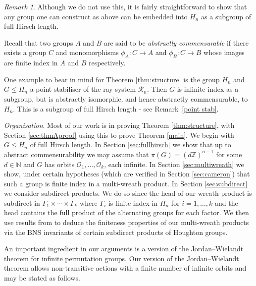 \documentclass[11pt,a4paper]{amsart}
\theoremstyle{definition}
\theoremstyle{remark}
\newtheorem*{remark*}{Remark}
\newcommand{\Z}{\mathbb Z}
\newcommand{\N}{\mathbb N}
\newcommand{\Ra}{\mathcal{R}}
\begin{document}
\begin{remark*}
	Although we do not use this, it is fairly straightforward to show that any group one can construct as above can be embedded into $H_n$ as a subgroup of full Hirsch length. 
\end{remark*}





Recall that two groups $A$ and $B$ are said to be \emph{abstractly commensurable} if there exists a group $C$ and monomorphisms $\phi_A: C\to A$ and $\phi_B: C\to B$ whose images are finite index in $A$ and $B$ respectively.

One example to bear in mind for Theorem \ref{thm:structure} is the group $H_n$ and $G\le H_n$ a point stabiliser of the ray system $\Ra_n$. Then $G$ is infinite index as a subgroup, but is abstractly isomorphic, and hence abstractly commensurable, to $H_n$. This is a subgroup of full Hirsch length - see Remark~\ref{point stab}. 


\medspace


\noindent\textit{Organisation}. Most of our work is in proving Theorem \ref{thm:structure}, with Section \ref{sec:thmAproof} using this to prove Theorem \ref{main}. We begin with $G\le H_n$ of full Hirsch length. In Section \ref{sec:fullhirsch} we show that up to abstract commensurability we may assume that $\pi(G)=(d\Z)^{n-1}$ for some $d\in\N$ and $G$ has orbits $\mathcal{O}_1, \ldots, \mathcal{O}_k$, each infinite. In Section \ref{sec:multiwreath} we show, under certain hypotheses (which are verified in Section \ref{sec:cameron}) that such a group is finite index in a multi-wreath product. In Section \ref{sec:subdirect} we consider subdirect products. We do so since the head of our wreath product is subdirect in $\Gamma_1\times\cdots\times\Gamma_k$ where $\Gamma_i$ is finite index in $H_n$ for $i=1, \ldots, k$ and the head contains the full product of the alternating groups for each factor. We then use results from \cite{KM1} to deduce the finiteness properties of our multi-wreath products via the BNS invariants of certain subdirect products of Houghton groups. 

An important ingredient in our arguments is a version of the Jordan--Wielandt theorem for infinite permutation groups. Our version of the Jordan--Wielandt theorem allows non-transitive actions with a finite number of infinite orbits and may be stated as follows. 
\end{document}
